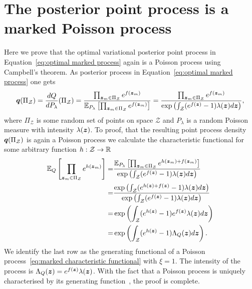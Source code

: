 \section{The posterior point process is a marked Poisson process}\label{app:optimal posterior poisson}
Here we prove  that the optimal variational posterior point process in Equation~\eqref{eq:optimal marked process} again is a Poisson process using Campbell's theorem. As posterior process in Equation~\eqref{eq:optimal marked process} one gets
\begin{equation}
\boldsymbol{q}(\Pi_{\mathcal{Z}}) = \frac{dQ}{dP_\lambda}(\Pi_{\mathcal{Z}}) = \frac{\prod_{\boldsymbol{z}_m\in \Pi_{\mathcal{Z}}} e^{f(\boldsymbol{z}_m)}}{\mathbb{E}_{P_\lambda}\left[ \prod_{\boldsymbol{z}_m\in \Pi_{\mathcal{Z}}} e^{f(\boldsymbol{z}_m)} \right]} = \frac{\prod_{\boldsymbol{z}_m\in \Pi_{\mathcal{Z}}} e^{f(\boldsymbol{z}_m)}}{\exp\left(\int_{\mathcal{Z} }(e^{f(\boldsymbol{z})} - 1) \lambda(\boldsymbol{z}) d\boldsymbol{z}\right)},
\end{equation}
where $\Pi_\mathcal{Z}$ is some random set of points on space $\mathcal{Z}$ and $P_\lambda$ is a random Poisson measure with intensity $\lambda(\boldsymbol{z})$. To proof, that the resulting point process density $\boldsymbol{q}(\Pi_{\mathcal{Z}})$ is again a Poisson process we calculate the characteristic functional for some arbitrary function $h:\mathcal{Z}\rightarrow \mathbb{R}$
\begin{equation}
\begin{split}
\mathbb{E}_{Q}\left[ \prod_{\boldsymbol{z}_m\in \Pi_\mathcal{Z}} e^{h(\boldsymbol{z}_m)} \right] = & \frac{\mathbb{E}_{P_\lambda}\left[ \prod_{\boldsymbol{z}_m\in \Pi_{\mathcal{Z}}} e^{h(\boldsymbol{z}_m) + f(\boldsymbol{z}_m)} \right]}{\exp\left(\int_{\mathcal{Z} }(e^{f(\boldsymbol{z})} - 1) \lambda(\boldsymbol{z}) d\boldsymbol{z}\right)} \\
= & \frac{\exp\left(\int_{\mathcal{Z} }(e^{h(\boldsymbol{z})+f(\boldsymbol{z})} - 1) \lambda(\boldsymbol{z}) d\boldsymbol{z}\right)}{\exp\left(\int_{\mathcal{Z} }(e^{f(\boldsymbol{z})} - 1) \lambda(\boldsymbol{z}) d\boldsymbol{z}\right)} \\
= &\exp\left(\int_{\mathcal{Z} }(e^{h(\boldsymbol{z})} - 1) e^{f(\boldsymbol{z})}\lambda(\boldsymbol{z}) d\boldsymbol{z}\right)\\
= &\exp\left(\int_{\mathcal{Z} }(e^{h(\boldsymbol{z})} - 1) \Lambda_Q(\boldsymbol{z}) d\boldsymbol{z}\right).
\end{split}
\end{equation}
We identify the last row as the generating functional of a Poisson process~\eqref{eq:marked characteristic functional} with $\xi=1$. The intensity of the process is $\Lambda_Q(\boldsymbol{z})=e^{f(\boldsymbol{z})}\lambda(\boldsymbol{z})$. With the fact that a Poisson process is uniquely characterised by its generating function~\citep[chap. 3]{kingman1993poisson}, the proof is complete.
